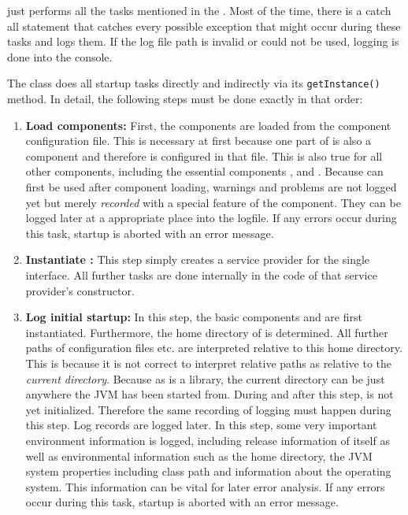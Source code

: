 \COMPcontext{} just performs all the tasks mentioned in the \REQUcontextStartupTasks{}. Most of the time, there is a catch all statement that catches every possible exception that might occur during these tasks and logs them. If the log file path is invalid or could not be used, logging is done into the console.

The class \CLASSJMetaContext{} does all startup tasks directly and indirectly via its \texttt{getInstance()} method. In detail, the following steps must be done exactly in that order:
\begin{enumerate}
	\item \textbf{Load components:} First, the components are loaded from the component configuration file. This is necessary at first because one part of \COMPcontext{} is also a \ComponentRegistry{} component and therefore is configured in that file. This is also true for all other components, including the essential components \COMPlogging{}, \COMPconfiguriation{} and \COMPextensionManagement{}. Because \COMPlogging{} can first be used after component loading, warnings and problems are not logged yet but merely \emph{recorded} with a special feature of the \COMPlogging{} component. They can be logged later at a appropriate place into the logfile. If any errors occur during this task, \LibName{} startup is aborted with an error message.
	\item \textbf{Instantiate \COMPcontext{}:} This step simply creates a service provider for the single \COMPcontext{} interface. All further tasks are done internally in the code of that service provider's constructor.
	\item \textbf{Log initial startup:} In this step, the basic components \COMPconfiguration{} and \COMPlogging{} are first instantiated. Furthermore, the home directory of \LibName{} is determined. All further paths of configuration files etc. are interpreted relative to this home directory. This is because it is not correct to interpret relative paths as relative to the \emph{current directory}. Because as \LibName{} is a library, the current directory can be just anywhere the JVM has been started from. During and after this step, \COMPlogging{} is not yet initialized. Therefore the same recording of logging must happen during this step. Log records are logged later. In this step, some very important environment information is logged, including release information of \LibName{} itself as well as environmental information such as the \LibName{} home directory, the JVM system properties including class path and information about the operating system. This information can be vital for later error analysis. If any errors occur during this task, \LibName{} startup is aborted with an error message.

\end{enumerate}
